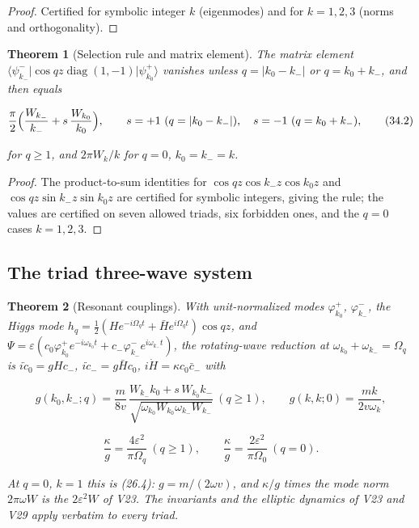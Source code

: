 \documentclass[11pt]{article}
\newtheorem{theorem}{Theorem}[section]
\theoremstyle{remark}
\begin{document}
\begin{proof}
Certified for symbolic integer \(k\) (eigenmodes) and for
\(k=1,2,3\) (norms and orthogonality).
\end{proof}

\begin{theorem}[Selection rule and matrix element]
\label{thm:v20v31-selection}
The matrix element
\(\langle\psi_{k_-}^-|\cos qz\operatorname{diag}(1,-1)|\psi_{k_0}^+\rangle\)
vanishes unless \(q=|k_0-k_-|\) or \(q=k_0+k_-\), and then equals

\[
 \frac\pi2\Bigl(\frac{W_{k_-}}{k_-}+s\,\frac{W_{k_0}}{k_0}\Bigr),\qquad
 s=+1\ (q=|k_0-k_-|),\quad s=-1\ (q=k_0+k_-),                         \tag{34.2}
\]

for \(q\ge1\), and \(2\pi W_k/k\) for \(q=0\), \(k_0=k_-=k\).
\end{theorem}

\begin{proof}
The product-to-sum identities for
\(\cos qz\cos k_-z\cos k_0z\) and \(\cos qz\sin k_-z\sin k_0z\) are
certified for symbolic integers, giving the rule; the values are
certified on seven allowed triads, six forbidden ones, and the
\(q=0\) cases \(k=1,2,3\).
\end{proof}

\subsection{The triad three-wave system}

\begin{theorem}[Resonant couplings]
\label{thm:v20v31-coupling}
With unit-normalized modes \(\varphi_{k_0}^+\), \(\varphi_{k_-}^-\), the
Higgs mode \(h_q=\tfrac12(He^{-i\Omega_qt}+\bar He^{i\Omega_qt})\cos qz\), and
\(\Psi=\varepsilon(c_0\varphi_{k_0}^+e^{-i\omega_{k_0}t}+c_-\varphi_{k_-}^-e^{i\omega_{k_-}t})\),
the rotating-wave reduction at \(\omega_{k_0}+\omega_{k_-}=\Omega_q\) is
\(i\dot c_0=gHc_-\), \(i\dot c_-=g\bar Hc_0\), \(i\dot H=\kappa c_0\bar c_-\)
with

\[
 g(k_0,k_-;q)=\frac m{8v}\,\frac{W_{k_-}k_0+s\,W_{k_0}k_-}{\sqrt{\omega_{k_0}W_{k_0}\omega_{k_-}W_{k_-}}}\ (q\ge1),\qquad
 g(k,k;0)=\frac{mk}{2v\omega_k},                                        \tag{34.3}
\]

\[
 \frac\kappa g=\frac{4\varepsilon^2}{\pi\Omega_q}\ (q\ge1),\qquad
 \frac\kappa g=\frac{2\varepsilon^2}{\pi\Omega_0}\ (q=0).                \tag{34.4}
\]

At \(q=0\), \(k=1\) this is (26.4): \(g=m/(2\omega v)\), and
\(\kappa/g\) times the mode norm \(2\pi\omega W\) is the \(2\varepsilon^2W\)
of V23.  The invariants and the elliptic dynamics of V23 and V29
apply verbatim to every triad.
\end{theorem}
\end{document}
